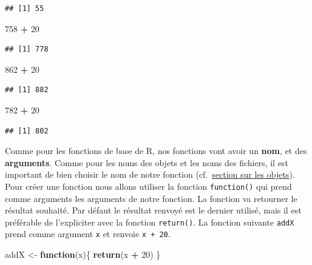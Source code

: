 \documentclass[
]{book}
\newenvironment{Shaded}{\begin{snugshade}}{\end{snugshade}}
\newcommand{\ControlFlowTok}[1]{\textcolor[rgb]{0.13,0.29,0.53}{\textbf{#1}}}
\newcommand{\DecValTok}[1]{\textcolor[rgb]{0.00,0.00,0.81}{#1}}
\newcommand{\KeywordTok}[1]{\textcolor[rgb]{0.13,0.29,0.53}{\textbf{#1}}}
\newcommand{\NormalTok}[1]{#1}
\newcommand{\OperatorTok}[1]{\textcolor[rgb]{0.81,0.36,0.00}{\textbf{#1}}}
\newcommand{\StringTok}[1]{\textcolor[rgb]{0.31,0.60,0.02}{#1}}
\begin{document}
\begin{verbatim}
## [1] 55
\end{verbatim}

\begin{Shaded}
\begin{Highlighting}[]
\DecValTok{758} \OperatorTok{+}\StringTok{ }\DecValTok{20}
\end{Highlighting}
\end{Shaded}

\begin{verbatim}
## [1] 778
\end{verbatim}

\begin{Shaded}
\begin{Highlighting}[]
\DecValTok{862} \OperatorTok{+}\StringTok{ }\DecValTok{20}
\end{Highlighting}
\end{Shaded}

\begin{verbatim}
## [1] 882
\end{verbatim}

\begin{Shaded}
\begin{Highlighting}[]
\DecValTok{782} \OperatorTok{+}\StringTok{ }\DecValTok{20}
\end{Highlighting}
\end{Shaded}

\begin{verbatim}
## [1] 802
\end{verbatim}

Comme pour les fonctions de base de R, nos fonctions vont avoir un \textbf{nom}, et des \textbf{arguments}. Comme pour les noms des objets et les noms des fichiers, il est important de bien choisir le nom de notre fonction (cf.~\protect\hyperlink{l011object}{section sur les objets}). Pour créer une fonction nous allons utiliser la fonction \texttt{function()} qui prend comme arguments les arguments de notre fonction. La fonction va retourner le résultat souhaité. Par défaut le résultat renvoyé est le dernier utilisé, mais il est préférable de l'expliciter avec la fonction \texttt{return()}. La fonction suivante \texttt{addX} prend comme argument \texttt{x} et renvoie \texttt{x\ +\ 20}.

\begin{Shaded}
\begin{Highlighting}[]
\NormalTok{addX <-}\StringTok{ }\ControlFlowTok{function}\NormalTok{(x)\{}
  \KeywordTok{return}\NormalTok{(x }\OperatorTok{+}\StringTok{ }\DecValTok{20}\NormalTok{)}
\NormalTok{\}}
\end{Highlighting}
\end{Shaded}
\end{document}
